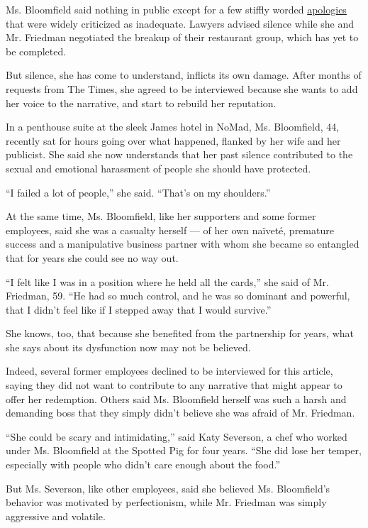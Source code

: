 Ms. Bloomfield said nothing in public except for a few stiffly worded
\href{https://www.instagram.com/p/BcqnG7hhWsW/?utm_source=ig_embed}{apologies}
that were widely criticized as inadequate. Lawyers advised silence while
she and Mr. Friedman negotiated the breakup of their restaurant group,
which has yet to be completed.

But silence, she has come to understand, inflicts its own damage. After
months of requests from The Times, she agreed to be interviewed because
she wants to add her voice to the narrative, and start to rebuild her
reputation.

In a penthouse suite at the sleek James hotel in NoMad, Ms. Bloomfield,
44, recently sat for hours going over what happened, flanked by her wife
and her publicist. She said she now understands that her past silence
contributed to the sexual and emotional harassment of people she should
have protected.

``I failed a lot of people,'' she said. ``That's on my shoulders.''

At the same time, Ms. Bloomfield, like her supporters and some former
employees, said she was a casualty herself --- of her own naïveté,
premature success and a manipulative business partner with whom she
became so entangled that for years she could see no way out.

``I felt like I was in a position where he held all the cards,'' she
said of Mr. Friedman, 59. ``He had so much control, and he was so
dominant and powerful, that I didn't feel like if I stepped away that I
would survive.''

She knows, too, that because she benefited from the partnership for
years, what she says about its dysfunction now may not be believed.

Indeed, several former employees declined to be interviewed for this
article, saying they did not want to contribute to any narrative that
might appear to offer her redemption. Others said Ms. Bloomfield herself
was such a harsh and demanding boss that they simply didn't believe she
was afraid of Mr. Friedman.

``She could be scary and intimidating,'' said Katy Severson, a chef who
worked under Ms. Bloomfield at the Spotted Pig for four years. ``She did
lose her temper, especially with people who didn't care enough about the
food.''

But Ms. Severson, like other employees, said she believed Ms.
Bloomfield's behavior was motivated by perfectionism, while Mr. Friedman
was simply aggressive and volatile.

